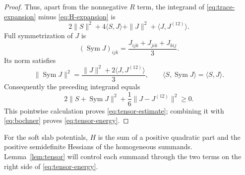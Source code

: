 \begin{proof}
Thus, apart from the nonnegative $R$ term, the integrand of
\eqref{eq:trace-expansion} minus \eqref{eq:H-expansion} is
\[
 2\|S\|^2+4\langle S,J\rangle
   +\|J\|^2+\langle J,J^{(12)}\rangle.
\]
Full symmetrization of $J$ is
\[
 (\operatorname{Sym}J)_{ijk}
 =\frac{J_{ijk}+J_{jik}+J_{kij}}3.
\]
Its norm satisfies
\[
 \|\operatorname{Sym}J\|^2
 =\frac{\|J\|^2+2\langle J,J^{(12)}\rangle}{3},
 \qquad
 \langle S,\operatorname{Sym}J\rangle=\langle S,J\rangle.
\]
Consequently the preceding integrand equals
\begin{equation}\label{eq:tensor-squares}
 2\|S+\operatorname{Sym}J\|^2
 +\frac16\|J-J^{(12)}\|^2\ge0.
\end{equation}
This pointwise calculation proves \eqref{eq:tensor-estimate};
combining it with \eqref{eq:bochner} proves
\eqref{eq:tensor-energy}.
\end{proof}

For the soft slab potentials, $H$ is the sum of a positive quadratic
part and the positive semidefinite Hessians of the homogeneous
summands.  Lemma~\ref{lem:tensor} will control each summand through
the two terms on the right side of \eqref{eq:tensor-energy}.
